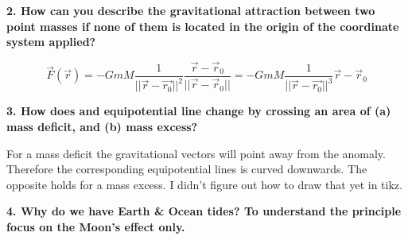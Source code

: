 \documentclass[a4paper,12pt]{article}
\newif\ifanswers
\begin{document}
\textbf{2. How can you describe the gravitational attraction between two point masses if none of them is located in the origin of the coordinate system applied?}
\ifanswers
  \begin{tcolorbox}[enhanced jigsaw,breakable,pad at break*=1mm,
    colback=blue!5!white,colframe=babyblueeyes,title=Solutions]
    $$
      \vec{F}(\vec{r}) = -GmM \frac{1}{||\vec{r}-\vec{r_0}||^2}\frac{\vec{r}-\vec{r}_0}{||\vec{r}-\vec{r}_0||}=-GmM \frac{1}{||\vec{r}-\vec{r_0}||^3}\vec{r}-\vec{r}_0
    $$
    \begin{center}
\end{center}
\end{tcolorbox}
\textbf{3. How does and equipotential line change by crossing an area of (a) mass deficit, and (b) mass excess?}
\ifanswers
  \begin{tcolorbox}[enhanced jigsaw,breakable,pad at break*=1mm,
    colback=blue!5!white,colframe=babyblueeyes,title=Solutions]
  For a mass deficit the gravitational vectors will point away from the anomaly. Therefore the corresponding equipotential lines is curved downwards. The opposite holds for a mass excess. I didn't figure out how to draw that yet in tikz.
  \end{tcolorbox}
  \textbf{4. Why do we have Earth \& Ocean tides? To understand the principle focus on the Moon's effect only.}
  \ifanswers
\end{document}

